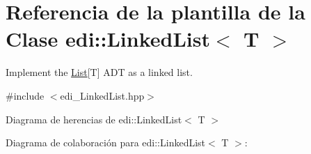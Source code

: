 \hypertarget{classedi_1_1LinkedList}{\section{Referencia de la plantilla de la Clase edi\+:\+:Linked\+List$<$ T $>$}
\label{classedi_1_1LinkedList}
}


Implement the \hyperlink{classedi_1_1List}{List}\mbox{[}T\mbox{]} A\+D\+T as a linked list.  




{\ttfamily \#include $<$edi\+\_\+\+Linked\+List.\+hpp$>$}



Diagrama de herencias de edi\+:\+:Linked\+List$<$ T $>$


Diagrama de colaboración para edi\+:\+:Linked\+List$<$ T $>$\+:
